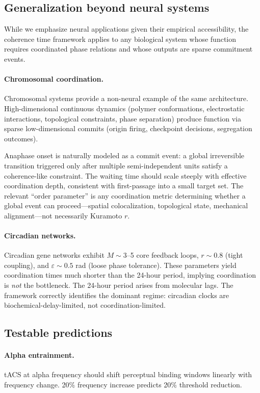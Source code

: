 \documentclass[12pt]{article}
\begin{document}
\subsection{Generalization beyond neural systems}

While we emphasize neural applications given their empirical accessibility, the coherence time framework applies to any biological system whose function requires coordinated phase relations and whose outputs are sparse commitment events.

\paragraph{Chromosomal coordination.} Chromosomal systems provide a non-neural example of the same architecture. High-dimensional continuous dynamics (polymer conformations, electrostatic interactions, topological constraints, phase separation) produce function via sparse low-dimensional commits (origin firing, checkpoint decisions, segregation outcomes).

Anaphase onset is naturally modeled as a commit event: a global irreversible transition triggered only after multiple semi-independent units satisfy a coherence-like constraint. The waiting time should scale steeply with effective coordination depth, consistent with first-passage into a small target set. The relevant ``order parameter'' is any coordination metric determining whether a global event can proceed---spatial colocalization, topological state, mechanical alignment---not necessarily Kuramoto $r$.

\paragraph{Circadian networks.} Circadian gene networks exhibit $M \sim 3$--5 core feedback loops, $r \sim 0.8$ (tight coupling), and $\varepsilon \sim 0.5$ rad (loose phase tolerance). These parameters yield coordination times much shorter than the 24-hour period, implying coordination is \emph{not} the bottleneck. The 24-hour period arises from molecular lags. The framework correctly identifies the dominant regime: circadian clocks are biochemical-delay-limited, not coordination-limited.

\subsection{Testable predictions}

\paragraph{Alpha entrainment.}
tACS at alpha frequency should shift perceptual binding windows linearly with frequency change. 20\% frequency increase predicts 20\% threshold reduction.
\end{document}
